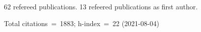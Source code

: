 62 refereed publications. 13 refeered publications as first author.

Total citations~=~1883; h-index~=~22 (2021-08-04)